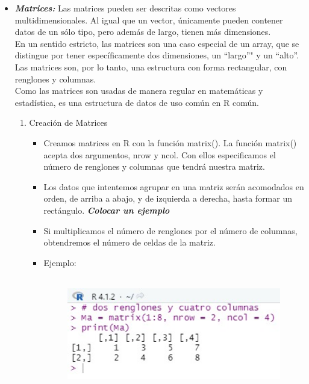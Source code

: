 \documentclass{article}
\begin{document}
\begin{itemize}
\item \textbf{\textit{Matrices: }}
Las matrices  pueden ser descritas como vectores multidimensionales. Al igual que un vector, únicamente pueden contener datos de un sólo tipo, pero además de largo, tienen más dimensiones.\\
En un sentido estricto, las matrices son una caso especial de un array, que se distingue por tener específicamente dos dimensiones, un “largo”" y un “alto”. Las matrices son, por lo tanto, una estructura con forma rectangular, con renglones y columnas.\\
Como las matrices son usadas de manera regular en matemáticas y estadística, es una estructura de datos de uso común en R común.
\begin{enumerate}
    \item  Creación de Matrices
    \begin{itemize}
        \item Creamos matrices en R con la función matrix(). La función matrix() acepta dos argumentos, nrow y ncol. Con ellos especificamos el número de renglones y columnas que tendrá nuestra matriz.
         
        \item Los datos que intentemos agrupar en una matriz serán acomodados en orden, de arriba a abajo, y de izquierda a derecha, hasta formar un rectángulo.
    \textbf{\textit{Colocar un ejemplo}}
    \item Si multiplicamos el número de renglones por el número de columnas, obtendremos el número de celdas de la matriz.
        \item Ejemplo:
        \begin{figure}[H]
            \centering
            \includegraphics[width=10cm,height=5cm]{imagenes/ejemplo6.jpg}
            \caption{\label{fig19}}
        \end{figure}
      \end{itemize}
    
\end{enumerate}


\end{itemize}
\end{document}
